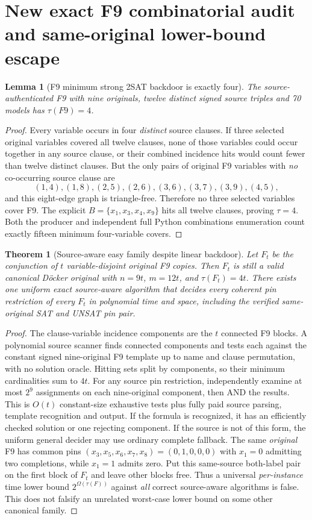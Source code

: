\documentclass[11pt]{article}
\newtheorem{theorem}{Theorem}
\newtheorem{lemma}{Lemma}
\begin{document}
\section{New exact F9 combinatorial audit and same-original lower-bound escape}
\begin{lemma}[F9 minimum strong 2SAT backdoor is exactly four]
The source-authenticated F9 with nine originals, twelve distinct signed source triples and 70 models has $\tau(F9)=4$.
\end{lemma}
\begin{proof}
Every variable occurs in four \emph{distinct} source clauses. If three selected original variables covered all twelve clauses, none of those variables could occur together in any source clause, or their combined incidence hits would count fewer than twelve distinct clauses. But the only pairs of original F9 variables with \emph{no} co-occurring source clause are
\[
 (1,4),(1,8),(2,5),(2,6),(3,6),(3,7),(3,9),(4,5),
\]
and this eight-edge graph is triangle-free. Therefore no three selected variables cover F9. The explicit $B=\{x_1,x_3,x_4,x_9\}$ hits all twelve clauses, proving $\tau=4$. Both the producer and independent full Python combinations enumeration count exactly fifteen minimum four-variable covers. \end{proof}

\begin{theorem}[Source-aware easy family despite linear backdoor]
Let $F_t$ be the conjunction of $t$ variable-disjoint original F9 copies. Then $F_t$ is still a \emph{valid canonical} D\"ocker original with $n=9t$, $m=12t$, and $\tau(F_t)=4t$. There exists one uniform exact source-aware algorithm that decides \emph{every coherent pin restriction} of every $F_t$ in polynomial time and space, including the verified same-original SAT and UNSAT pin pair.
\end{theorem}
\begin{proof}
The clause-variable incidence components are the $t$ connected F9 blocks. A polynomial source scanner finds connected components and tests each against the constant signed nine-original F9 template up to name and clause permutation, with no solution oracle. Hitting sets split by components, so their minimum cardinalities sum to $4t$. For any source pin restriction, independently examine at most $2^9$ assignments on each nine-original component, then AND the results. This is $O(t)$ constant-size exhaustive tests plus fully paid source parsing, template recognition and output. If the formula is recognized, it has an efficiently checked solution or one rejecting component. If the source is not of this form, the uniform general decider may use ordinary complete fallback. The same \emph{original} F9 has common pins $(x_3,x_5,x_6,x_7,x_8)=(0,1,0,0,0)$ with $x_1=0$ admitting two completions, while $x_1=1$ admits zero. Put this same-source both-label pair on the first block of $F_t$ and leave other blocks free. Thus a universal \emph{per-instance} time lower bound $2^{\Omega(\tau(F))}$ against \emph{all} correct source-aware algorithms is false. This does not falsify an unrelated worst-case lower bound on some other canonical family. \end{proof}
\end{document}
